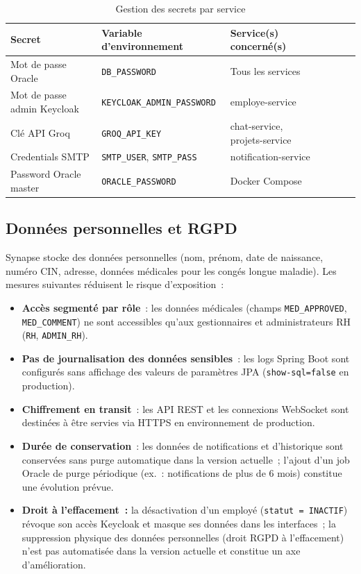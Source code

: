 \begin{table}[H]
\centering
\caption{Gestion des secrets par service}
\label{tab:secrets}
\begin{tabularx}{\textwidth}{VlVLVlV}
\hline
\textbf{Secret} & \textbf{Variable d’environnement} & \textbf{Service(s) concerné(s)} \\
\hline
Mot de passe Oracle & \texttt{DB\_PASSWORD} & Tous les services \\
\hline
Mot de passe admin Keycloak & \texttt{KEYCLOAK\_ADMIN\_PASSWORD} & employe-service \\
\hline
Clé API Groq & \texttt{GROQ\_API\_KEY} & chat-service, projets-service \\
\hline
Credentials SMTP & \texttt{SMTP\_USER}, \texttt{SMTP\_PASS} & notification-service \\
\hline
Password Oracle master & \texttt{ORACLE\_PASSWORD} & Docker Compose \\
\hline
\end{tabularx}
\end{table}

\subsection{Données personnelles et RGPD}

Synapse stocke des données personnelles (nom, prénom, date de naissance, numéro CIN,
adresse, données médicales pour les congés longue maladie). Les mesures suivantes
réduisent le risque d'exposition~:

\begin{itemize}[leftmargin=*,nosep]
  \item \textbf{Accès segmenté par rôle}~: les données médicales (champs
        \texttt{MED\_APPROVED}, \texttt{MED\_COMMENT}) ne sont accessibles qu'aux
        gestionnaires et administrateurs RH (\texttt{RH}, \texttt{ADMIN\_RH}).
  \item \textbf{Pas de journalisation des données sensibles}~: les logs Spring Boot
        sont configurés sans affichage des valeurs de paramètres JPA (\texttt{show-sql=false}
        en production).
  \item \textbf{Chiffrement en transit}~: les API REST et les connexions WebSocket
        sont destinées à être servies via HTTPS en environnement de production.
  \item \textbf{Durée de conservation}~: les données de notifications et d'historique
        sont conservées sans purge automatique dans la version actuelle~; l'ajout
        d'un job Oracle de purge périodique (ex.~: notifications de plus de 6 mois)
        constitue une évolution prévue.
  \item \textbf{Droit à l'effacement~:} la désactivation d'un employé (\texttt{statut = INACTIF})
        révoque son accès Keycloak et masque ses données dans les interfaces~; la
        suppression physique des données personnelles (droit RGPD à l'effacement)
        n'est pas automatisée dans la version actuelle et constitue un axe d'amélioration.
\end{itemize}

